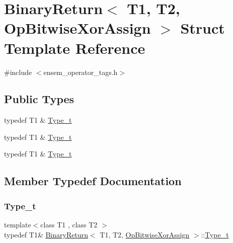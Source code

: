\hypertarget{structBinaryReturn_3_01T1_00_01T2_00_01OpBitwiseXorAssign_01_4}{}\section{Binary\+Return$<$ T1, T2, Op\+Bitwise\+Xor\+Assign $>$ Struct Template Reference}
\label{structBinaryReturn_3_01T1_00_01T2_00_01OpBitwiseXorAssign_01_4}


{\ttfamily \#include $<$ensem\+\_\+operator\+\_\+tags.\+h$>$}

\subsection*{Public Types}
\begin{DoxyCompactItemize}
\item 
typedef T1 \& \mbox{\hyperlink{structBinaryReturn_3_01T1_00_01T2_00_01OpBitwiseXorAssign_01_4_a1f3b2b68c0947783fd491c1f8342dfc0}{Type\+\_\+t}}
\item 
typedef T1 \& \mbox{\hyperlink{structBinaryReturn_3_01T1_00_01T2_00_01OpBitwiseXorAssign_01_4_a1f3b2b68c0947783fd491c1f8342dfc0}{Type\+\_\+t}}
\item 
typedef T1 \& \mbox{\hyperlink{structBinaryReturn_3_01T1_00_01T2_00_01OpBitwiseXorAssign_01_4_a1f3b2b68c0947783fd491c1f8342dfc0}{Type\+\_\+t}}
\end{DoxyCompactItemize}


\subsection{Member Typedef Documentation}
\mbox{\label{structBinaryReturn_3_01T1_00_01T2_00_01OpBitwiseXorAssign_01_4_a1f3b2b68c0947783fd491c1f8342dfc0}} 
\subsubsection{\texorpdfstring{Type\_t}{Type\_t}\hspace{0.1cm}{\footnotesize\ttfamily [1/3]}}
{\footnotesize\ttfamily template$<$class T1 , class T2 $>$ \\
typedef T1\& \mbox{\hyperlink{structBinaryReturn}{Binary\+Return}}$<$ T1, T2, \mbox{\hyperlink{structOpBitwiseXorAssign}{Op\+Bitwise\+Xor\+Assign}} $>$\+::\mbox{\hyperlink{structBinaryReturn_3_01T1_00_01T2_00_01OpBitwiseXorAssign_01_4_a1f3b2b68c0947783fd491c1f8342dfc0}{Type\+\_\+t}}}

